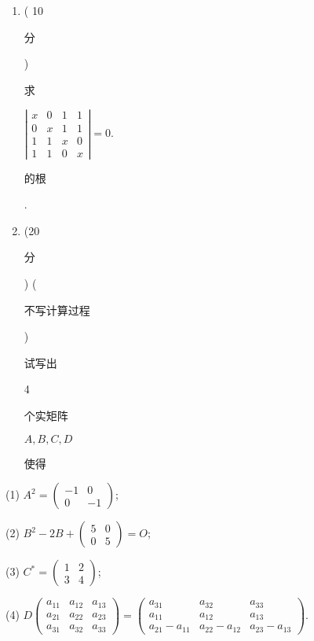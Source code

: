 \documentclass[10pt]{article}
\begin{document}
\begin{enumerate}
  \item ( 10 \begin{CJK}{UTF8}{mj}分\end{CJK}) \begin{CJK}{UTF8}{mj}求\end{CJK} $\left|\begin{array}{llll}x & 0 & 1 & 1 \\ 0 & x & 1 & 1 \\ 1 & 1 & x & 0 \\ 1 & 1 & 0 & x\end{array}\right|=0$. \begin{CJK}{UTF8}{mj}的根\end{CJK}.

  \item (20 \begin{CJK}{UTF8}{mj}分\end{CJK}) (\begin{CJK}{UTF8}{mj}不写计算过程\end{CJK}) \begin{CJK}{UTF8}{mj}试写出\end{CJK} 4 \begin{CJK}{UTF8}{mj}个实矩阵\end{CJK} $A, B, C, D$ \begin{CJK}{UTF8}{mj}使得\end{CJK}

\end{enumerate}
(1) $A^{2}=\left(\begin{array}{cc}-1 & 0 \\ 0 & -1\end{array}\right)$;

(2) $B^{2}-2 B+\left(\begin{array}{ll}5 & 0 \\ 0 & 5\end{array}\right)=O$;

(3) $C^{*}=\left(\begin{array}{ll}1 & 2 \\ 3 & 4\end{array}\right)$;

(4) $D\left(\begin{array}{ccc}a_{11} & a_{12} & a_{13} \\ a_{21} & a_{22} & a_{23} \\ a_{31} & a_{32} & a_{33}\end{array}\right)=\left(\begin{array}{ccc}a_{31} & a_{32} & a_{33} \\ a_{11} & a_{12} & a_{13} \\ a_{21}-a_{11} & a_{22}-a_{12} & a_{23}-a_{13}\end{array}\right)$.
\end{document}
